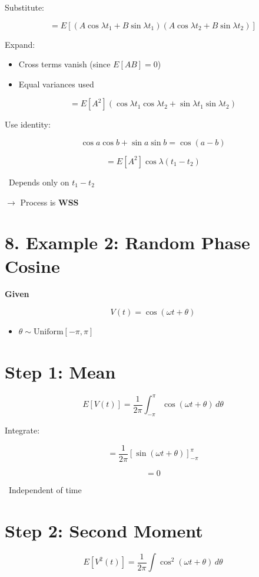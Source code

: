 \documentclass[12pt]{article}
\begin{document}
Substitute:

\[
= E[(A\cos\lambda t_1 + B\sin\lambda t_1)(A\cos\lambda t_2 + B\sin\lambda t_2)]
\]

Expand:
\begin{itemize}
    \item Cross terms vanish (since $E[AB] = 0$)
    \item Equal variances used
\end{itemize}

\[
= E[A^2](\cos\lambda t_1 \cos\lambda t_2 + \sin\lambda t_1 \sin\lambda t_2)
\]

Use identity:

\[
\cos a \cos b + \sin a \sin b = \cos(a - b)
\]

\[
= E[A^2]\cos\lambda(t_1 - t_2)
\]

\checkmark\ Depends only on $t_1 - t_2$

$\rightarrow$ Process is \textbf{WSS}

\section*{8. Example 2: Random Phase Cosine}

\textbf{Given}

\[
V(t) = \cos(\omega t + \theta)
\]

\begin{itemize}
    \item $\theta \sim \text{Uniform}[-\pi, \pi]$
\end{itemize}

\section*{Step 1: Mean}

\[
E[V(t)] = \frac{1}{2\pi} \int_{-\pi}^{\pi} \cos(\omega t + \theta)\, d\theta
\]

Integrate:

\[
= \frac{1}{2\pi} \left[\sin(\omega t + \theta)\right]_{-\pi}^{\pi}
\]

\[
= 0
\]

\checkmark\ Independent of time

\section*{Step 2: Second Moment}

\[
E[V^2(t)] = \frac{1}{2\pi} \int \cos^2(\omega t + \theta)\, d\theta
\]
\end{document}
